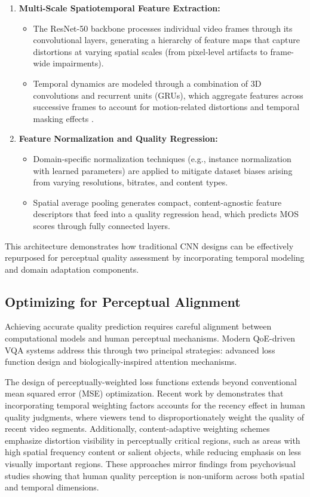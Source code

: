 \begin{enumerate}  
    \item \textbf{Multi-Scale Spatiotemporal Feature Extraction:}  
    \begin{itemize}  
        \item The ResNet-50 backbone processes individual video frames through its convolutional layers, generating a hierarchy of feature maps that capture distortions at varying spatial scales (from pixel-level artifacts to frame-wide impairments).
        \item Temporal dynamics are modeled through a combination of 3D convolutions and recurrent units (GRUs), which aggregate features across successive frames to account for motion-related distortions and temporal masking effects \cite{lee2021video}.
    \end{itemize}  
    
    \item \textbf{Feature Normalization and Quality Regression:}  
    \begin{itemize}  
        \item Domain-specific normalization techniques (e.g., instance normalization with learned parameters) are applied to mitigate dataset biases arising from varying resolutions, bitrates, and content types.
        \item Spatial average pooling generates compact, content-agnostic feature descriptors that feed into a quality regression head, which predicts MOS scores through fully connected layers.
    \end{itemize}  
\end{enumerate}  

This architecture demonstrates how traditional CNN designs can be effectively repurposed for perceptual quality assessment by incorporating temporal modeling and domain adaptation components.

\subsection{Optimizing for Perceptual Alignment}  
Achieving accurate quality prediction requires careful alignment between computational models and human perceptual mechanisms. Modern QoE-driven VQA systems address this through two principal strategies: advanced loss function design and biologically-inspired attention mechanisms.

The design of perceptually-weighted loss functions extends beyond conventional mean squared error (MSE) optimization. Recent work by \cite{min2024perceptual} demonstrates that incorporating temporal weighting factors accounts for the recency effect in human quality judgments, where viewers tend to disproportionately weight the quality of recent video segments. Additionally, content-adaptive weighting schemes emphasize distortion visibility in perceptually critical regions, such as areas with high spatial frequency content or salient objects, while reducing emphasis on less visually important regions. These approaches mirror findings from psychovisual studies showing that human quality perception is non-uniform across both spatial and temporal dimensions.

